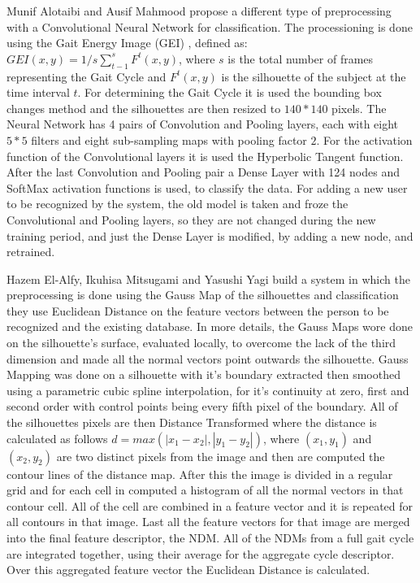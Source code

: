\documentclass[12pt]{article}
\theoremstyle{definition}
\begin{document}
	Munif Alotaibi and Ausif Mahmood \cite{gait-with-gei} propose a different type of preprocessing with a Convolutional Neural Network for classification. The processioning is done using the Gait Energy Image (GEI) \cite{gei}, defined as: $GEI(x, y)=1/s\sum_{t-1}^{s}F^t(x, y)$, where $s$ is the total number of frames representing the Gait Cycle and $F^t(x, y)$ is the silhouette of the subject at the time interval $t$. For determining the Gait Cycle it is used the bounding box changes method and the silhouettes are then resized to $140 * 140$ pixels. The Neural Network has 4 pairs of Convolution and Pooling layers, each with eight $5 * 5$ filters and eight sub-sampling maps with pooling factor $2$. For the activation function of the Convolutional layers it is used the Hyperbolic Tangent function. After the last Convolution and Pooling pair a Dense Layer with 124 nodes and SoftMax activation functions is used, to classify the data. For adding a new user to be recognized by the system, the old model is taken and froze the Convolutional and Pooling layers, so they are not changed during the new training period, and just the Dense Layer is modified, by adding a new node, and retrained.

	Hazem El-Alfy, Ikuhisa Mitsugami and Yasushi Yagi \cite{gait-with-curvature-map} build a system in which the preprocessing is done using the Gauss Map of the silhouettes and classification they use Euclidean Distance on the feature vectors between the person to be recognized and the existing database. In more details, the Gauss Maps wore done on the silhouette's surface, evaluated locally, to overcome the lack of the third dimension and made all the normal vectors point outwards the silhouette. Gauss Mapping was done on a silhouette with it's boundary extracted then smoothed using a parametric cubic spline interpolation, for it's continuity at zero, first and second order with control points being every fifth pixel of the boundary. All of the silhouettes pixels are then Distance Transformed where the distance is calculated as follows $d=max(|x_1-x_2|, |y_1-y_2|)$, where $(x_1, y_1)$ and $(x_2, y_2)$ are two distinct pixels from the image and then are computed the contour lines of the distance map. After this the image is divided in a regular grid and for each cell in computed a histogram of all the normal vectors in that contour cell. All of the cell are combined in a feature vector and it is repeated for all contours in that image. Last all the feature vectors for that image are merged into the final feature descriptor, the NDM. All of the NDMs from a full gait cycle are integrated together, using their average for the aggregate cycle descriptor. Over this aggregated feature vector the Euclidean Distance is calculated.
\end{document}
